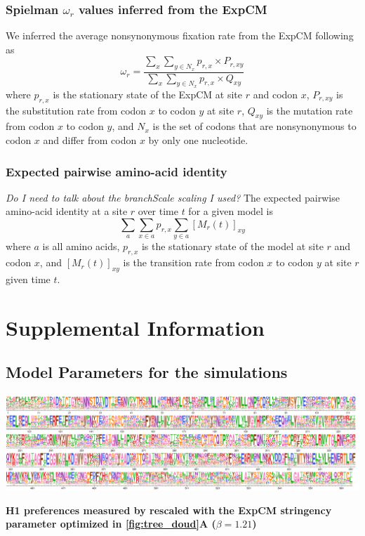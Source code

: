 \documentclass[11pt]{article}
\begin{document}
\subsubsection*{Spielman $\omega_{r}$ values inferred from the ExpCM} 
We inferred the average nonsynonymous fixation rate from the ExpCM following~\citet{spielman2015relationship} as 
\begin{equation}
\label{eq:w_r}
\omega_{r} = \frac{\sum_{x} \sum_{y \in N_x} {p_{r,x} \times P_{r,xy}}}{\sum_{x} \sum_{y \in N_x} {p_{r,x} \times Q_{xy}}}
\end{equation}
where $p_{r,x}$ is the stationary state of the ExpCM at site $r$ and codon $x$, $P_{r,xy}$ is the substitution rate from codon $x$ to codon $y$ at site $r$, $Q_{xy}$ is the mutation rate from codon $x$ to codon $y$, and $N_x$ is the set of codons that are nonsynonymous to codon $x$ and differ from codon $x$ by only one nucleotide. 

\subsubsection*{Expected pairwise amino-acid identity}
\textit{Do I need to talk about the branchScale scaling I used?}
The expected pairwise amino-acid identity at a site $r$ over time $t$ for a given model is 
\begin{equation}
\label{eq:f}
\sum_a \sum_{x \in a} p_{r,x} \sum_{y \in a} [M_{r}\left(t\right)]_{xy}
\end{equation}
where $a$ is all amino acids, $p_{r,x}$ is the stationary state of the model at site $r$ and codon $x$, and $[M_{r}\left(t\right)]_{xy}$ is the transition rate from codon $x$ to codon $y$ at site $r$ given time $t$. 

\newpage
\section*{Supplemental Information}

\subsection*{Model Parameters for the simulations}

\begin{suppfig}[H]
\centerline{\includegraphics[width=\textwidth]{figures/prefs_doud}}
\caption{\label{suppfig:prefs_doud}
\textbf{H1 preferences measured by \cite{doud2016accurate} rescaled with the ExpCM stringency parameter optimized in \ref{fig:tree_doud}A  ($\beta = 1.21$)} 
}
\end{suppfig}
\end{document}
